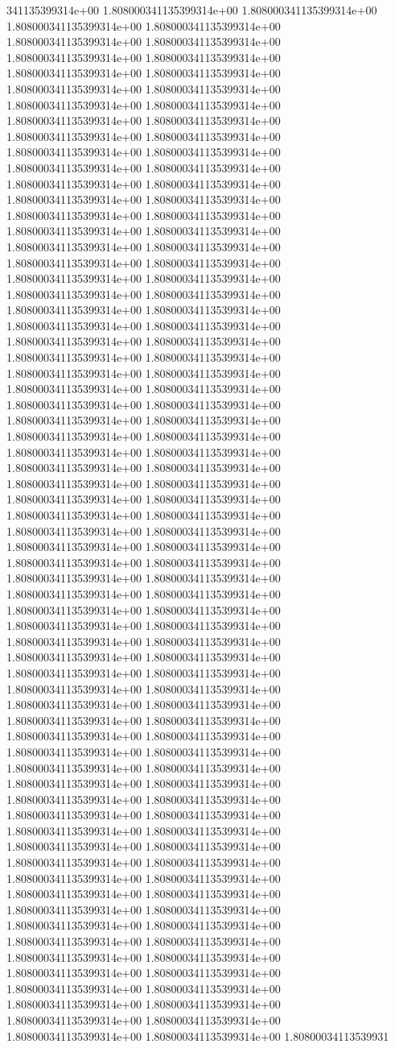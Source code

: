 341135399314e+00	1.808000341135399314e+00	1.808000341135399314e+00	1.808000341135399314e+00	1.808000341135399314e+00	1.808000341135399314e+00	1.808000341135399314e+00	1.808000341135399314e+00	1.808000341135399314e+00	1.808000341135399314e+00	1.808000341135399314e+00	1.808000341135399314e+00	1.808000341135399314e+00	1.808000341135399314e+00	1.808000341135399314e+00	1.808000341135399314e+00	1.808000341135399314e+00	1.808000341135399314e+00	1.808000341135399314e+00	1.808000341135399314e+00	1.808000341135399314e+00	1.808000341135399314e+00	1.808000341135399314e+00	1.808000341135399314e+00	1.808000341135399314e+00	1.808000341135399314e+00	1.808000341135399314e+00	1.808000341135399314e+00	1.808000341135399314e+00	1.808000341135399314e+00	1.808000341135399314e+00	1.808000341135399314e+00	1.808000341135399314e+00	1.808000341135399314e+00	1.808000341135399314e+00	1.808000341135399314e+00	1.808000341135399314e+00	1.808000341135399314e+00	1.808000341135399314e+00	1.808000341135399314e+00	1.808000341135399314e+00	1.808000341135399314e+00	1.808000341135399314e+00	1.808000341135399314e+00	1.808000341135399314e+00	1.808000341135399314e+00	1.808000341135399314e+00	1.808000341135399314e+00	1.808000341135399314e+00	1.808000341135399314e+00	1.808000341135399314e+00	1.808000341135399314e+00	1.808000341135399314e+00	1.808000341135399314e+00	1.808000341135399314e+00	1.808000341135399314e+00	1.808000341135399314e+00	1.808000341135399314e+00	1.808000341135399314e+00	1.808000341135399314e+00	1.808000341135399314e+00	1.808000341135399314e+00	1.808000341135399314e+00	1.808000341135399314e+00	1.808000341135399314e+00	1.808000341135399314e+00	1.808000341135399314e+00	1.808000341135399314e+00	1.808000341135399314e+00	1.808000341135399314e+00	1.808000341135399314e+00	1.808000341135399314e+00	1.808000341135399314e+00	1.808000341135399314e+00	1.808000341135399314e+00	1.808000341135399314e+00	1.808000341135399314e+00	1.808000341135399314e+00	1.808000341135399314e+00	1.808000341135399314e+00	1.808000341135399314e+00	1.808000341135399314e+00	1.808000341135399314e+00	1.808000341135399314e+00	1.808000341135399314e+00	1.808000341135399314e+00	1.808000341135399314e+00	1.808000341135399314e+00	1.808000341135399314e+00	1.808000341135399314e+00	1.808000341135399314e+00	1.808000341135399314e+00	1.808000341135399314e+00	1.808000341135399314e+00	1.808000341135399314e+00	1.808000341135399314e+00	1.808000341135399314e+00	1.808000341135399314e+00	1.808000341135399314e+00	1.808000341135399314e+00	1.808000341135399314e+00	1.808000341135399314e+00	1.808000341135399314e+00	1.808000341135399314e+00	1.808000341135399314e+00	1.808000341135399314e+00	1.808000341135399314e+00	1.808000341135399314e+00	1.808000341135399314e+00	1.808000341135399314e+00	1.808000341135399314e+00	1.808000341135399314e+00	1.808000341135399314e+00	1.808000341135399314e+00	1.808000341135399314e+00	1.808000341135399314e+00	1.808000341135399314e+00	1.808000341135399314e+00	1.808000341135399314e+00	1.808000341135399314e+00	1.808000341135399314e+00	1.808000341135399314e+00	1.808000341135399314e+00	1.808000341135399314e+00	1.808000341135399314e+00	1.808000341135399314e+00	1.808000341135399314e+00	1.808000341135399314e+00	1.808000341135399314e+00	1.808000341135399314e+00	1.808000341135399314e+00	1.808000341135399314e+00	1.808000341135399314e+00	1.80800034113539931